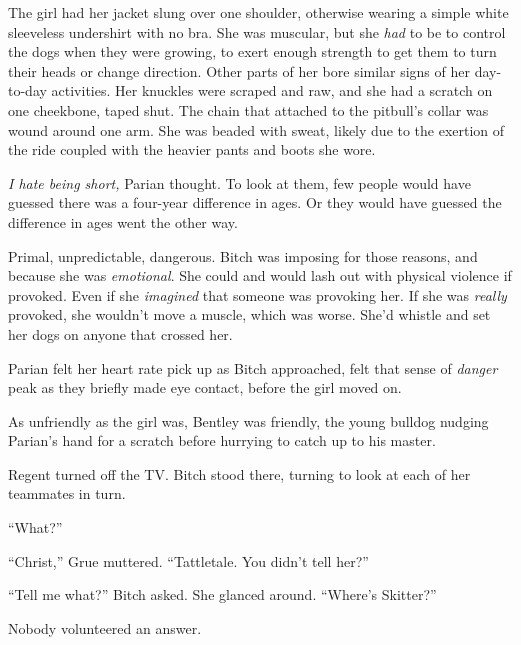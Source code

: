 The girl had her jacket slung over one shoulder, otherwise wearing a simple white sleeveless undershirt with no bra.  She was muscular, but she \emph{had} to be to control the dogs when they were growing, to exert enough strength to get them to turn their heads or change direction.  Other parts of her bore similar signs of her day-to-day activities.  Her knuckles were scraped and raw, and she had a scratch on one cheekbone, taped shut.  The chain that attached to the pitbull's collar was wound around one arm.  She was beaded with sweat, likely due to the exertion of the ride coupled with the heavier pants and boots she wore.



\emph{I hate being short, }Parian thought.  To look at them, few people would have guessed there was a four-year difference in ages.  Or they would have guessed the difference in ages went the other way.



Primal, unpredictable, dangerous.  Bitch was imposing for those reasons, and because she was \emph{emotional}.  She could and would lash out with physical violence if provoked.  Even if she \emph{imagined} that someone was provoking her.  If she was \emph{really} provoked, she wouldn't move a muscle, which was worse.  She'd whistle and set her dogs on anyone that crossed her.



Parian felt her heart rate pick up as Bitch approached, felt that sense of \emph{danger} peak as they briefly made eye contact, before the girl moved on.



As unfriendly as the girl was, Bentley was friendly, the young bulldog nudging Parian's hand for a scratch before hurrying to catch up to his master.



Regent turned off the TV.  Bitch stood there, turning to look at each of her teammates in turn.



``What?''



``Christ,'' Grue muttered.  ``Tattletale.  You didn't tell her?''



``Tell me what?'' Bitch asked.  She glanced around.  ``Where's Skitter?''



Nobody volunteered an answer.



